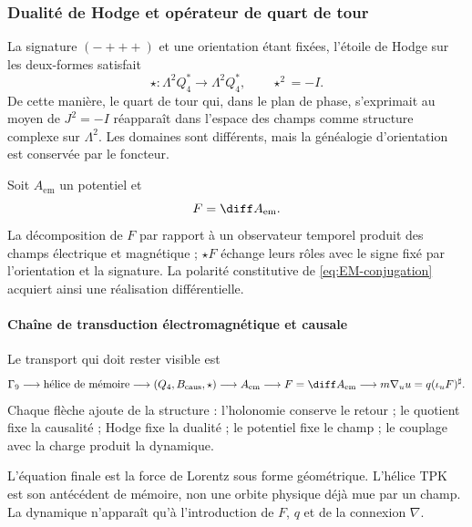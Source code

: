 \subsubsection{Dualité de Hodge et opérateur de quart de tour}

La signature \((-+++ )\) et une orientation étant fixées, l'étoile de Hodge sur
les deux-formes satisfait
\begin{equation}
\star:\Lambda^2Q_4^*\to\Lambda^2Q_4^*,
\qquad \star^2=-I.
\label{eq:hodge-star}
\end{equation}
De cette manière, le quart de tour qui, dans le plan de phase, s'exprimait au moyen de
\(J^2=-I\) réapparaît dans l'espace des champs comme structure complexe sur
\(\Lambda^2\). Les domaines sont différents, mais la généalogie d'orientation
est conservée par le foncteur.

Soit \(A_{\mathrm{em}}\) un potentiel et
\begin{equation}
F=\diff A_{\mathrm{em}}.
\label{eq:F-dA}
\end{equation}
La décomposition de \(F\) par rapport à un observateur temporel produit des champs
électrique et magnétique ; \(\star F\) échange leurs rôles avec le signe fixé
par l'orientation et la signature. La polarité constitutive de
\eqref{eq:EM-conjugation} acquiert ainsi une réalisation différentielle.

\paragraph{Chaîne de transduction électromagnétique et causale}

Le transport qui doit rester visible est
\begin{equation}
\Gamma_9
\longrightarrow\text{hélice de mémoire}
\longrightarrow(Q_4,B_{\mathrm{caus}},\star)
\longrightarrow A_{\mathrm{em}}
\longrightarrow F=\diff A_{\mathrm{em}}
\longrightarrow
m\nabla_u u=q(\iota_uF)^\sharp.
\label{eq:lorentz-chain}
\end{equation}
Chaque flèche ajoute de la structure : l'holonomie conserve le retour ; le quotient fixe
la causalité ; Hodge fixe la dualité ; le potentiel fixe le champ ; le couplage
avec la charge produit la dynamique.

L'équation finale est la force de Lorentz sous forme géométrique. L'hélice TPK
est son antécédent de mémoire, non une orbite physique déjà mue par un champ. La
dynamique n'apparaît qu'à l'introduction de \(F\), \(q\) et de la connexion \(\nabla\).

